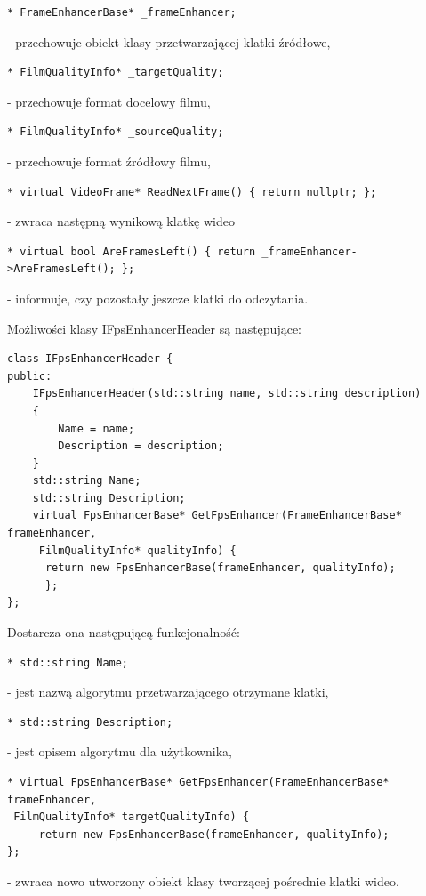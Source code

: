 \documentclass[twoside]{projektInzynierskiMS}
\begin{document}
\begin{verbatim}
* FrameEnhancerBase* _frameEnhancer;
\end{verbatim}
- przechowuje obiekt klasy przetwarzającej klatki źródłowe,

\begin{verbatim}
* FilmQualityInfo* _targetQuality;
\end{verbatim}
- przechowuje format docelowy filmu,

\begin{verbatim}
* FilmQualityInfo* _sourceQuality;
\end{verbatim}
- przechowuje format źródłowy filmu,

\begin{verbatim}
* virtual VideoFrame* ReadNextFrame() { return nullptr; };
\end{verbatim}
- zwraca następną wynikową klatkę wideo

\begin{verbatim}
* virtual bool AreFramesLeft() { return _frameEnhancer->AreFramesLeft(); };
\end{verbatim}
- informuje, czy pozostały jeszcze klatki do odczytania.


Możliwości klasy IFpsEnhancerHeader są następujące:

\begin{verbatim}
class IFpsEnhancerHeader {
public:
    IFpsEnhancerHeader(std::string name, std::string description)
    {
    	Name = name;
    	Description = description;
    }
    std::string Name;
    std::string Description;
    virtual FpsEnhancerBase* GetFpsEnhancer(FrameEnhancerBase* frameEnhancer,
	 FilmQualityInfo* qualityInfo) {
      return new FpsEnhancerBase(frameEnhancer, qualityInfo); 
      };
};
\end{verbatim}

Dostarcza ona następującą funkcjonalność:
\begin{verbatim}
* std::string Name;
\end{verbatim}
 - jest nazwą algorytmu przetwarzającego otrzymane klatki,
 \begin{verbatim}
* std::string Description;
\end{verbatim}
 - jest opisem algorytmu dla użytkownika,
\begin{verbatim}
* virtual FpsEnhancerBase* GetFpsEnhancer(FrameEnhancerBase* frameEnhancer,
 FilmQualityInfo* targetQualityInfo) { 
     return new FpsEnhancerBase(frameEnhancer, qualityInfo);
};
\end{verbatim} 
 - zwraca nowo utworzony obiekt klasy tworzącej pośrednie klatki wideo.
\end{document}
